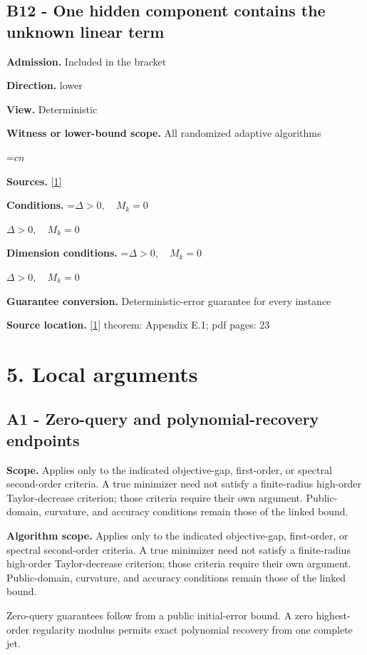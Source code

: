 \documentclass[10pt,a4paper]{article}
\newcommand{\AtlasMath}[1]{\par\begingroup\centering\setbox0=\hbox{$\displaystyle #1$}\ifdim\wd0>1.4\linewidth\typeout{ATLAS WIDE FORMULA: \the\wd0}\fi\ifdim\wd0>\linewidth\resizebox{\linewidth}{!}{\box0}\else\box0\fi\par\endgroup}
\newcommand{\AtlasInlineMath}[1]{\begingroup\setbox0=\hbox{$#1$}\ifdim\wd0>.4\linewidth\endgroup\AtlasMath{#1}\else\endgroup$#1$\fi}
\begin{document}
\subsection{B12 - One hidden component contains the unknown linear term}
\textbf{Admission.} Included in the bracket

\textbf{Direction.} lower

\textbf{View.} Deterministic

\textbf{Witness or lower-bound scope.} All randomized adaptive algorithms

\AtlasMath{cn}
\textbf{Sources.} \href{https://arxiv.org/pdf/2609.28202v2}{[1]}

\textbf{Conditions.} \AtlasInlineMath{\Delta>0,\quad M_k=0}

\textbf{Dimension conditions.} \AtlasInlineMath{\Delta>0,\quad M_k=0}

\textbf{Guarantee conversion.} Deterministic-error guarantee for every instance

\textbf{Source location.} \href{https://arxiv.org/pdf/2609.28202v2}{[1]} theorem: Appendix E.1; pdf pages: 23

\section{5. Local arguments}
\subsection{A1 - Zero-query and polynomial-recovery endpoints}
\textbf{Scope.} Applies only to the indicated objective-gap, first-order, or spectral second-order criteria. A true minimizer need not satisfy a finite-radius high-order Taylor-decrease criterion; those criteria require their own argument. Public-domain, curvature, and accuracy conditions remain those of the linked bound.

\textbf{Algorithm scope.} Applies only to the indicated objective-gap, first-order, or spectral second-order criteria. A true minimizer need not satisfy a finite-radius high-order Taylor-decrease criterion; those criteria require their own argument. Public-domain, curvature, and accuracy conditions remain those of the linked bound.

Zero-query guarantees follow from a public initial-error bound. A zero highest-order regularity modulus permits exact polynomial recovery from one complete jet.
\end{document}
